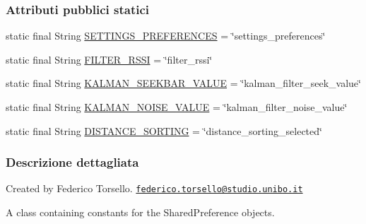 \subsubsection*{Attributi pubblici statici}
\begin{DoxyCompactItemize}
\item 
static final String \hyperlink{classit_1_1unibo_1_1torsello_1_1bluetoothpositioning_1_1constant_1_1SettingConstants_ae1b406c787a7efb87d585d5c8b80493d_ae1b406c787a7efb87d585d5c8b80493d}{S\+E\+T\+T\+I\+N\+G\+S\+\_\+\+P\+R\+E\+F\+E\+R\+E\+N\+C\+ES} = \char`\"{}settings\+\_\+preferences\char`\"{}
\item 
static final String \hyperlink{classit_1_1unibo_1_1torsello_1_1bluetoothpositioning_1_1constant_1_1SettingConstants_a60a6d73ab1d42653b8a0c5b10c1c80c5_a60a6d73ab1d42653b8a0c5b10c1c80c5}{F\+I\+L\+T\+E\+R\+\_\+\+R\+S\+SI} = \char`\"{}filter\+\_\+rssi\char`\"{}
\item 
static final String \hyperlink{classit_1_1unibo_1_1torsello_1_1bluetoothpositioning_1_1constant_1_1SettingConstants_a7ba43b29e467efb129d86c917734c94b_a7ba43b29e467efb129d86c917734c94b}{K\+A\+L\+M\+A\+N\+\_\+\+S\+E\+E\+K\+B\+A\+R\+\_\+\+V\+A\+L\+UE} = \char`\"{}kalman\+\_\+filter\+\_\+seek\+\_\+value\char`\"{}
\item 
static final String \hyperlink{classit_1_1unibo_1_1torsello_1_1bluetoothpositioning_1_1constant_1_1SettingConstants_a2751989834b974103dda417fb8b10337_a2751989834b974103dda417fb8b10337}{K\+A\+L\+M\+A\+N\+\_\+\+N\+O\+I\+S\+E\+\_\+\+V\+A\+L\+UE} = \char`\"{}kalman\+\_\+filter\+\_\+noise\+\_\+value\char`\"{}
\item 
static final String \hyperlink{classit_1_1unibo_1_1torsello_1_1bluetoothpositioning_1_1constant_1_1SettingConstants_ad86af94213ec3f11669289c4972c7658_ad86af94213ec3f11669289c4972c7658}{D\+I\+S\+T\+A\+N\+C\+E\+\_\+\+S\+O\+R\+T\+I\+NG} = \char`\"{}distance\+\_\+sorting\+\_\+selected\char`\"{}
\end{DoxyCompactItemize}


\subsubsection{Descrizione dettagliata}
Created by Federico Torsello. \href{mailto:federico.torsello@studio.unibo.it}{\tt federico.\+torsello@studio.\+unibo.\+it}

A class containing constants for the Shared\+Preference objects. 

